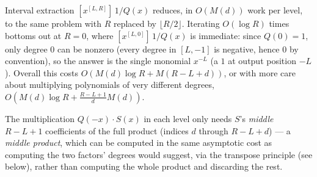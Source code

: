 \documentclass[11pt]{article}
\begin{document}
\begin{theorembox}
Interval extraction $[x^{[L,R]}]\,1/Q(x)$ reduces, in $O(M(d))$ work per
level, to the same problem with $R$ replaced by $\lfloor R/2\rfloor$.
Iterating $O(\log R)$ times bottoms out at $R=0$, where
$[x^{[L,0]}]\,1/Q(x)$ is immediate: since $Q(0)=1$, only degree $0$ can be
nonzero (every degree in $[L,-1]$ is negative, hence $0$ by convention),
so the answer is the single monomial $x^{-L}$ (a $1$ at output position
$-L$). Overall this costs $O(M(d)\log R + M(R-L+d))$, or with more care
about multiplying polynomials of very different degrees,
$O\!\left(M(d)\log R + \tfrac{R-L+1}{d}M(d)\right)$.
\end{theorembox}

\begin{notebox}
The multiplication $Q(-x)\cdot S(x)$ in each level only needs $S$'s
\emph{middle} $R-L+1$ coefficients of the full product (indices $d$
through $R-L+d$) --- a \emph{middle product}, which can be computed in
the same asymptotic cost as computing the two factors' degrees would
suggest, via the transpose principle (see below), rather than computing
the whole product and discarding the rest.
\end{notebox}
\end{document}
